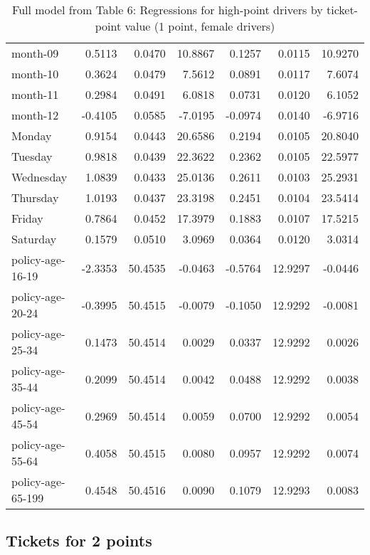 \documentclass[10pt]{article}
\begin{document}
\begin{table}[ht]
\begin{tabular}{lrrrrrr}
  month-09 & 0.5113 & 0.0470 & 10.8867 & 0.1257 & 0.0115 & 10.9270 \\ 
  month-10 & 0.3624 & 0.0479 & 7.5612 & 0.0891 & 0.0117 & 7.6074 \\ 
  month-11 & 0.2984 & 0.0491 & 6.0818 & 0.0731 & 0.0120 & 6.1052 \\ 
  month-12 & -0.4105 & 0.0585 & -7.0195 & -0.0974 & 0.0140 & -6.9716 \\ 
  Monday & 0.9154 & 0.0443 & 20.6586 & 0.2194 & 0.0105 & 20.8040 \\ 
  Tuesday & 0.9818 & 0.0439 & 22.3622 & 0.2362 & 0.0105 & 22.5977 \\ 
  Wednesday & 1.0839 & 0.0433 & 25.0136 & 0.2611 & 0.0103 & 25.2931 \\ 
  Thursday & 1.0193 & 0.0437 & 23.3198 & 0.2451 & 0.0104 & 23.5414 \\ 
  Friday & 0.7864 & 0.0452 & 17.3979 & 0.1883 & 0.0107 & 17.5215 \\ 
  Saturday & 0.1579 & 0.0510 & 3.0969 & 0.0364 & 0.0120 & 3.0314 \\ 
  policy-age-16-19 & -2.3353 & 50.4535 & -0.0463 & -0.5764 & 12.9297 & -0.0446 \\ 
  policy-age-20-24 & -0.3995 & 50.4515 & -0.0079 & -0.1050 & 12.9292 & -0.0081 \\ 
  policy-age-25-34 & 0.1473 & 50.4514 & 0.0029 & 0.0337 & 12.9292 & 0.0026 \\ 
  policy-age-35-44 & 0.2099 & 50.4514 & 0.0042 & 0.0488 & 12.9292 & 0.0038 \\ 
  policy-age-45-54 & 0.2969 & 50.4514 & 0.0059 & 0.0700 & 12.9292 & 0.0054 \\ 
  policy-age-55-64 & 0.4058 & 50.4515 & 0.0080 & 0.0957 & 12.9292 & 0.0074 \\ 
  policy-age-65-199 & 0.4548 & 50.4516 & 0.0090 & 0.1079 & 12.9293 & 0.0083 \\ 
   \hline
\end{tabular}
\caption{Full model from Table 6: Regressions for high-point drivers by ticket-point value (1 point, female drivers)} 
\label{tab_6_1_pts_F}
\end{table}


\clearpage
\pagebreak




\subsection{Tickets for 2 points}
\end{document}
